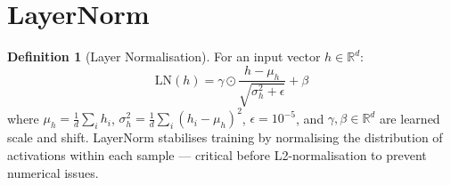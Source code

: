 \documentclass[12pt,a4paper]{article}
\theoremstyle{definition}
\newtheorem{definition}[theorem]{Definition}
\theoremstyle{remark}
\begin{document}
\section{LayerNorm}

\begin{definition}[Layer Normalisation]
For an input vector $h \in \mathbb{R}^d$:
\[
  \text{LN}(h) = \gamma \odot \frac{h - \mu_h}{\sqrt{\sigma_h^2 + \epsilon}} + \beta
\]
where $\mu_h = \frac{1}{d}\sum_i h_i$, $\sigma_h^2 = \frac{1}{d}\sum_i (h_i - \mu_h)^2$,
$\epsilon = 10^{-5}$, and $\gamma, \beta \in \mathbb{R}^d$ are learned scale and shift.
LayerNorm stabilises training by normalising the distribution of activations
within each sample — critical before L2-normalisation to prevent numerical issues.
\end{definition}
\end{document}
